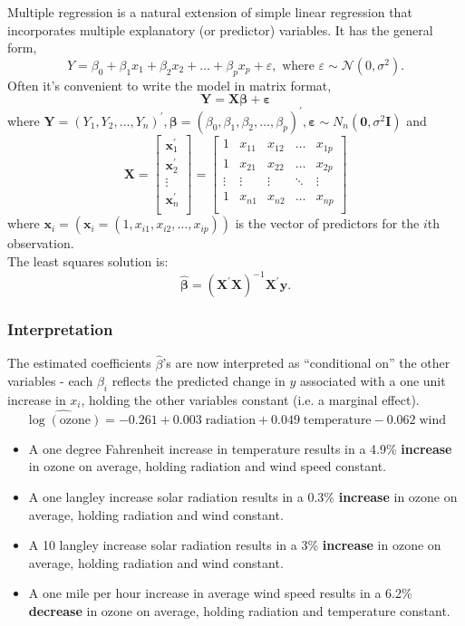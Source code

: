 \documentclass[a4paper]{article}
\begin{document}
Multiple regression is a natural extension of simple linear regression that incorporates multiple explanatory (or predictor) variables. It has the general form,
\[
	Y = \beta_0 + \beta_1 x_1 + \beta_2 x_2 + \ldots + \beta_p x_p + \varepsilon, \text { where }\varepsilon\sim \mathcal{N}(0,\sigma^2).
\]
Often it's convenient to write the model in matrix format,
\[
	\symbf{Y} = \symbf{X} \symbf{\beta} + \symbf{\varepsilon}
\]
where \( \symbf{Y} = (Y_1,Y_2,\dotsc,Y_n)^\prime, \symbf{\beta} = (\beta_0,\beta_1,\beta_2,\dotsc,\beta_p)^\prime, \symbf{\varepsilon} \sim N_n(\textbf{0},\sigma^2 \symbf{I}) \) and
\[
	\symbf{X} = 
	\begin{bmatrix}
		\symbf{x}_1^\prime \\
		\symbf{x}_2^\prime \\
		\vdots \\
		\symbf{x}_n^\prime \\
	\end{bmatrix}
	=
	\begin{bmatrix}
		1 & x_{11} & x_{12} & \hdots & x_{1p} \\
		1 & x_{21} & x_{22} & \hdots & x_{2p} \\
		\vdots & \vdots & \vdots & \ddots & \vdots \\
		1 & x_{n1} & x_{n2} & \hdots & x_{np} \\
	\end{bmatrix}
\]
where \( \symbf{x}_i = (\symbf{x}_i = (1, x_{i1}, x_{i2}, \dotsc, x_{ip})) \) is the vector of predictors for the \( i \)th observation.\\
The least squares solution is:
\[
	\hat{\symbf{\beta}} = (\symbf{X}^\prime \symbf{X})^{-1} \symbf{X}^\prime \symbf{y}.
\]
\subsubsection{Interpretation}
The estimated coefficients \( \hat{\beta} \)'s are now interpreted as ``conditional on'' the other variables - each \( \beta_i \) reflects the predicted change in \( y \) associated with a one unit increase in \( x_i \), holding the other variables constant (i.e. a marginal effect).
\[
	\widehat{\log(\text{ozone})} = -0.261 + 0.003\; \text{radiation} + 0.049\; \text{temperature} - 0.062\; \text{wind}
\]
\begin{itemize}
	\item A one degree Fahrenheit increase in temperature results in a 4.9\% \textbf{increase} in ozone on average, holding radiation and wind speed constant.
	\item A one langley increase solar radiation results in a 0.3\% \textbf{increase} in ozone on average, holding radiation and wind constant.
	\item A 10 langley increase solar radiation results in a 3\% \textbf{increase} in ozone on average, holding radiation and wind constant.
	\item A one mile per hour increase in average wind speed results in a 6.2\% \textbf{decrease} in ozone on average, holding radiation and temperature constant.
\end{itemize}
\end{document}
